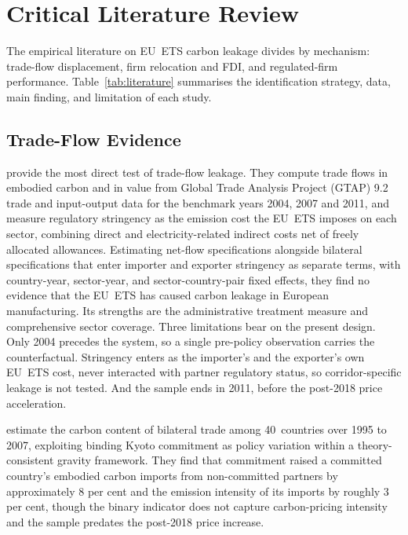 \section{Critical Literature Review}
\label{sec:literature}

The empirical literature on EU~ETS carbon leakage divides by mechanism: trade-flow displacement, firm relocation and FDI, and regulated-firm performance. Table~\ref{tab:literature} summarises the identification strategy, data, main finding, and limitation of each study.

\subsection{Trade-Flow Evidence}

\citet{naegele2019} provide the most direct test of trade-flow leakage. They compute trade flows in embodied carbon and in value from Global Trade Analysis Project (GTAP) 9.2 trade and input-output data for the benchmark years 2004, 2007 and 2011, and measure regulatory stringency as the emission cost the EU~ETS imposes on each sector, combining direct and electricity-related indirect costs net of freely allocated allowances. Estimating net-flow specifications alongside bilateral specifications that enter importer and exporter stringency as separate terms, with country-year, sector-year, and sector-country-pair fixed effects, they find no evidence that the EU~ETS has caused carbon leakage in European manufacturing. Its strengths are the administrative treatment measure and comprehensive sector coverage. Three limitations bear on the present design. Only 2004 precedes the system, so a single pre-policy observation carries the counterfactual. Stringency enters as the importer's and the exporter's own EU~ETS cost, never interacted with partner regulatory status, so corridor-specific leakage is not tested. And the sample ends in 2011, before the post-2018 price acceleration.

\citet{aichele2015} estimate the carbon content of bilateral trade among 40~countries over 1995 to 2007, exploiting binding Kyoto commitment as policy variation within a theory-consistent gravity framework. They find that commitment raised a committed country's embodied carbon imports from non-committed partners by approximately 8 per cent and the emission intensity of its imports by roughly 3 per cent, though the binary indicator does not capture carbon-pricing intensity and the sample predates the post-2018 price increase.

